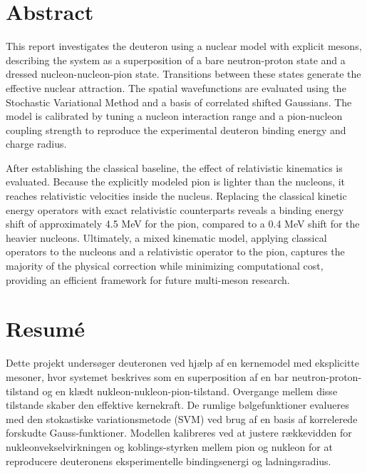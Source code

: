\documentclass[a4paper,oneside,article,12pt]{memoir}
\begin{document}

\chapter*{Abstract}
\pagestyle{empty}
This report investigates the deuteron using a nuclear model with explicit mesons, describing the system as a superposition of a bare neutron-proton state and a dressed nucleon-nucleon-pion state. Transitions between these states generate the effective nuclear attraction. The spatial wavefunctions are evaluated using the Stochastic Variational Method and a basis of correlated shifted Gaussians. The model is calibrated by tuning a nucleon interaction range and a pion-nucleon coupling strength to reproduce the experimental deuteron binding energy and charge radius. 

After establishing the classical baseline, the effect of relativistic kinematics is evaluated. Because the explicitly modeled pion is lighter than the nucleons, it reaches relativistic velocities inside the nucleus. Replacing the classical kinetic energy operators with exact relativistic counterparts reveals a binding energy shift of approximately 4.5 MeV for the pion, compared to a 0.4 MeV shift for the heavier nucleons. Ultimately, a mixed kinematic model, applying classical operators to the nucleons and a relativistic operator to the pion, captures the majority of the physical correction while minimizing computational cost, providing an efficient framework for future multi-meson research.

\newpage
\chapter*{Resumé}
\pagestyle{empty}
Dette projekt undersøger deuteronen ved hjælp af en kernemodel med eksplicitte mesoner, hvor systemet beskrives som en superposition af en bar neutron-proton-tilstand og en klædt nukleon-nukleon-pion-tilstand. Overgange mellem disse tilstande skaber den effektive kernekraft. De rumlige bølgefunktioner evalueres med den stokastiske variationsmetode (SVM) ved brug af en basis af korrelerede forskudte Gauss-funktioner. Modellen kalibreres ved at justere rækkevidden for nukleonvekselvirkningen og koblings-styrken mellem pion og nukleon for at reproducere deuteronens eksperimentelle bindingsenergi og ladningsradius. 
\end{document}
